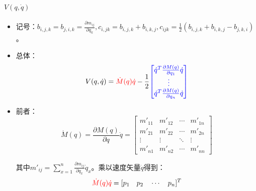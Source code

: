 \documentclass[
12pt, %
a4paper, 
oneside, %
headinclude,footinclude, %
]{scrartcl}
\begin{document}
\paragraph{$ V(q,\dot{q}) $}
\begin{itemize}
\item 记号：$ b_{i,j,k} = b_{j,i,k} = \frac{\partial m_{ij}}{\partial q_k}, c_{i,jk} = b_{i,j,k} + b_{i,k,j}, c_{ijk} = \frac{1}{2}(b_{i,j,k} + b_{i,k,j} - b_{j,k,i}) $。
\item 总体：
$$ V(q,\dot{q}) = \textcolor{red}{\dot{M}(q)\dot{q}} - \frac{1}{2}\textcolor{blue}{\begin{bmatrix} \dot{q}^T\frac{\partial M(q)}{\partial q_1}\dot{q} \\ \vdots \\ \dot{q}^T\frac{\partial M(q)}{\partial q_n}\dot{q} \end{bmatrix}} $$
\item 前者：
$$ \dot{M}(q) = \frac{\partial M(q)}{\partial q}\dot{q} = \begin{bmatrix} m'_{11} & m'_{12} & \cdots & m'_{1n} \\ m'_{21} & m'_{22} & \cdots & m'_{2n} \\ \vdots & \vdots & \ddots & \vdots \\ m'_{n1} & m'_{n2} & \cdots & m'_{nn} \end{bmatrix} $$

其中$ m'_{ij} = \sum_{x = 1}^n \frac{\partial m_{ij}}{\partial q_x}\dot{q}_x $。乘以速度矢量$ \dot{q} $得到：
$$ \textcolor{red}{\dot{M}(q)\dot{q}} = [p_1 \quad p_2 \quad \cdots \quad p_n]^T $$


\end{itemize}
\end{document}
